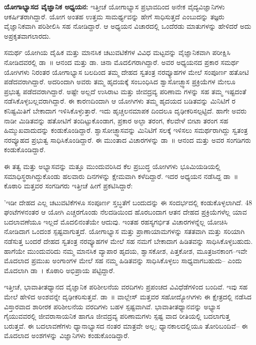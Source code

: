\textbf{ಯೋಗಾಭ್ಯಾಸದ ವೈಜ್ಞಾನಿಕ ಅಧ್ಯಯನ:} ಇತ್ತೀಚೆ ಯೋಗಾಭ್ಯಾಸ ಪ್ರಭಾವದಿಂದ ಅನೇಕ ವೈದ್ಯವಿಜ್ಞಾನಿಗಳು ಆಕರ್ಷಿತರಾಗಿದ್ದಾರೆ. ಯೋಗ ಅಂತಹ ಉತ್ತಮ ಸಾಮರ್ಥ್ಯವನ್ನು ಹೇಗೆ ಸಾಧಿಸುತ್ತದೆ ಎಂಬುದನ್ನು ತಜ್ಞರು ವೈಜ್ಞಾನಿಕವಾಗಿ ಪರಿಶೀಲಿಸಿ ಸಹ ನೋಡಿದ್ದಾರೆ. ಆ ಅಧ್ಯಯನ ವಿಚಾರದಲ್ಲಿ ಒಂದೆರಡು ಮಾತುಗಳನ್ನು ಹೇಳಿದರೆ ಅದು ಅಪ್ರಕೃತವಾಗಲಾರದು.

ಸಮರ್ಥ ಯೋಗಿಯ ದೈಹಿಕ ಮತ್ತು ಮಾನಸಿಕ ಚಟುವಟಿಕೆಗಳ ವಿವಿಧ ಮಟ್ಟವನ್ನು ವೈಜ್ಞಾನಿಕವಾಗಿ ಪರೀಕ್ಷಿಸಿ ನೋಡಿದವರಲ್ಲಿ ಡಾ~॥ ಆನಂದ ಮತ್ತು ಡಾ. ಚಿನಾ ಮೊದಲಿಗರಾಗಿದ್ದಾರೆ. ಅವರ ಅಧ್ಯಯನದ ಪ್ರಕಾರ ಸಮರ್ಥ ಯೋಗಿಗಳು ನಿರಂತರ ಯೋಗಾಭ್ಯಾಸ ಬಲದಿಂದ ತಮ್ಮ ದೇಹದ ಸ್ವತಂತ್ರ ನರವ್ಯೂಹಗಳ  ಮೇಲೆ ಸಂಪೂರ್ಣ ಹತೋಟಿ ಪಡೆದವರಾಗಿದ್ದಾರೆ. ಅದರಿಂದಾಗಿ ಅವರು ತಮ್ಮ ಹೃದಯಕ್ಕೆ ಸಂಬಂಧಿಸಿದ ಶ್ವಾಸೋಚ್ಛ್ವಾಸ ಪ್ರಕ್ರಿಯೆಗಳ ಮೇಲೂ ಪ್ರಭುತ್ವ ಪಡೆದವರಾಗಿದ್ದಾರೆ. ಅಷ್ಟೇ ಅಲ್ಲದೆ ಉಸಿರಾಟ ಮತ್ತು ಜೀವದ್ರವ್ಯ ಪರಿಣಾಮ  ಗಳನ್ನು ಸಹ ತಮ್ಮ ಇಷ್ಟದಂತೆ ನಡೆಸಿಕೊಳ್ಳಬಲ್ಲವರಾಗಿದ್ದಾರೆ. ಈ ಕಾರಣದಿಂದಾಗಿ ಆ ಯೋಗಿಗಳು ತಮ್ಮ ಹೃದಯದ ಬಡಿತವನ್ನು ಮಿನಿಟಿಗೆ  ರ ಕನಿಷ್ಟಮಿತಿಗೆ ಬೇಕಾದಾಗ ಇಳಿಸಿಕೊಳ್ಳುತ್ತಾರೆ. ಇದು ಹೃಚ್ಚಲನಮಾಪಕ  ದಿಂದಲೂ ದೃಢೀಕರಿಸಲ್ಪಟ್ಟಿದೆ. ಹಾಗೇ ಅವರು ನಾಡೀ ಮಿಡಿತವನ್ನು ಹತೋಟಿಗೆ ತಂದಿಟ್ಟುಕೊಂಡಾಗ,  ಪ್ರಕಾರ ಅಲ್ಫಾ ತರಂಗ, ಕೆಲವೇಳೆ ಬೀಟಾ ತರಂಗ ಸಹ ಹಿಮ್ಮುಖವಾದುದನ್ನು ಕಂಡುಕೊಂಡಿದ್ದಾರೆ. ಶ್ವಾಸೋಚ್ಛ್ವಾಸವನ್ನು ಮಿನಿಟಿಗೆ  ಸಲಕ್ಕೆ ಇಳಿಸಲು ಸಮರ್ಥರಾಗಿದ್ದು ಸ್ವತಂತ್ರ ನರವ್ಯೂಹದ ಪ್ರಭುತ್ವ ಸಾಧಿಸಿಕೊಂಡಿದ್ದಾರೆ. ಈ ಮುಂತಾದ ವಿಚಾರಗಳನ್ನು ಡಾ~॥ ಆನಂದ ಮತ್ತು ಅವರ ಸಂಗಡಿಗರು ಕಂಡುಕೊಂಡಿದ್ದಾರೆ.

ಈ ತತ್ವ ಮತ್ತು ಅಭ್ಯಾಸವನ್ನು ಮತ್ತೂ ಮುಂದುವರಿಸಿದ ಕೆಲ ಪ್ರಬುದ್ಧ ಯೋಗಿಗಳು ಭೂಮಿಯಡಿಯಲ್ಲಿ ಸಮಾಧಿಸ್ಥರಾಗಿದ್ದುಕೊಂಡು ಹಲವಾರು ದಿನಗಳನ್ನು ಕ್ಷೇಮವಾಗಿ ಕಳೆದಿದ್ದಾರೆ. ಇದರ ಅಧ್ಯಯನ ನಡೆಸಿದ್ದ ಡಾ~॥ ಕೊಠಾರಿ ಮತ್ತವರ ಸಂಗಡಿಗರು ಇತ್ತೀಚೆ ಹೀಗೆ ಪ್ರಕಟಿಸಿದ್ದಾರೆ:

'ಇಡೀ ದೇಹದ ಎಲ್ಲ ಚಟುವಟಿಕೆಗಳೂ ಸಂಪೂರ್ಣ ಸ್ತಬ್ಧತೆಗೆ ಬಂದುದನ್ನು ಈ ಸಂದರ್ಭದಲ್ಲಿ ಕಂಡುಕೊಳ್ಳಲಾಗಿದೆ. 48 ಘಂಟೆಗಳನಂತರ ಆ ಯೋಗಿ ಎಚ್ಚರಗೊಂಡು ನೆಲದಡಿಯಿಂದ ಹೊರಬಂದಾಗ ಆತನ ದೇಹದ ಪ್ರಕ್ರಿಯೆಗಳೆಲ್ಲ ಯಾವ ಬದಲಾವಣೆಯೂ ಇಲ್ಲದೆ ಮೊದಲಿನಂತೆಯೇ ಆದುವು. ಇಂತಹ ರಹಸ್ಯಗರ್ಭಿತ ವಿಚಾರಗಳನ್ನೆಲ್ಲ ಯೋಚಿಸಿ ನೋಡಿದಾಗ ಒಂದಂಶ ಸ್ಪಷ್ಟವಾಗುತ್ತದೆ. ಯೋಗಾಭ್ಯಾಸ ಮತ್ತು ಪ್ರಾಣಾಯಾಮಗಳನ್ನು ಸತತವಾಗಿ ಮತ್ತು ಸರಿಯಾಗಿ ನಡೆಸುತ್ತ ಬಂದರೆ ದೇಹದ ಸ್ವತಂತ್ರ ನರವ್ಯೂಹಗಳ ಮೇಲೆ ಸಹ ನಮಗೆ ಬೇಕಾದಾಗ ಹಿಡಿತವನ್ನು ಸಾಧಿಸಿಕೊಳ್ಳಬಹುದು. ಹಾಗೆಯೇ ಮುಂದುವರಿದು ನಮ್ಮ ಮಾನಸಿಕ ವ್ಯಾಪಾರ ಹೃದಯ, ಶ್ವಾಸಕೋಶ, ಪಿತ್ತಕೋಶ, ಮೂತ್ರಜನಕಾಂಗ–ಇವೇ ಮೊದಲಾದ ಪ್ರಮುಖ ಅಂಗಾಂಗಳ ಮೇಲೆ ಸಹ ನಮ್ಮ ಹಿಡಿತವನ್ನು ಸಾಧಿಸಿಕೊಳ್ಳಲು ಸಾಧ್ಯವಾಗಬಹುದು– ಎಂದು ಮೊದಲಾಗಿ ಡಾ~। ಕೊಠಾರಿ ಅಭಿಪ್ರಾಯ ಪಟ್ಟಿದ್ದಾರೆ.

ಇತ್ತೀಚೆ, ಭಾವಾತೀತಧ್ಯಾನದ  ವೈಜ್ಞಾನಿಕ ಪರಿಶೀಲನೆಯ ವರದಿಗಳು ಪ್ರಪಂಚದ ವಿವಿಧೆಡೆಗಳಿಂದ ಬಂದಿವೆ. ಇವು ಸಹ ಮೇಲೆ ಹೇಳಿದ ಅಂಶವನ್ನೇ ದೃಢೀಕರಿಸುತ್ತವೆ. ಡಾ~॥ ವಾಲ್ಲೇಸ್ ಮತ್ತವರ ಸಹೋದ್ಯೋಗಿಗಳು ಈ ಕ್ಷೇತ್ರದಲ್ಲಿ ನಡೆಸಿದ ವಿಸ್ತಾರವಾದ ಶಾರೀರಕ ಪರಿಶೀಲನೆಯ ವರದಿಗಳು ಬಹಳ ಸ್ಪಷ್ಟವಾಗಿವೆ. ಭಾವಾತೀತಧ್ಯಾನವನ್ನು ಅಭ್ಯಾಸ ಗೈಯುವವರಲ್ಲಿ ಜೀವರಾಸಾಯನಿಕ ಹಾಗೂ ಜೀವದ್ರವ್ಯ ಪರಿಣಾಮಗಳು ಸ್ಪಷ್ಟ ವಾದ ರೀತಿಯಲ್ಲಿ ಬದಲಾಗುತ್ತ ಬರುತ್ತವೆ. ಈ ಬದಲಾವಣೆಗಳು ಧ್ಯಾನಾಭ್ಯಾಸದ ನಂತರ ಮಾತ್ರವೇ ಅಲ್ಲ; ಧ್ಯಾನಕಾಲದಲ್ಲಿಯೂ ತೋರಿಬಂದಿವೆ– ಈ ಮೊದಲಾದ ಅಂಶಗಳನ್ನು ವಿಜ್ಞಾನಿಗಳು ಕಂಡುಕೊಂಡಿದ್ದಾರೆ.

